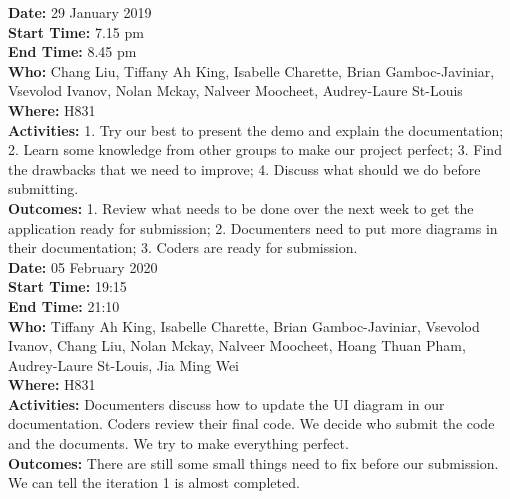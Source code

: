 \documentclass[12pt]{article}
\begin{document}
{\bf Date:} 29 January 2019\\
{\bf Start Time:} 7.15 pm\\
{\bf End Time:} 8.45 pm \\
{\bf Who:} Chang Liu, Tiffany Ah King, Isabelle Charette, Brian Gamboc-Javiniar, Vsevolod Ivanov, Nolan Mckay, Nalveer Moocheet, Audrey-Laure St-Louis\\
{\bf Where:} H831 \\
{\bf Activities:} 
1. Try our best to present the demo and explain the documentation;
2. Learn some knowledge from other groups to make our project perfect;
3. Find the drawbacks that we need to improve; 
4. Discuss what should we do before submitting. \\
{\bf Outcomes:} 
1. Review what needs to be done over the next week to get the application ready for submission; 
2. Documenters need to put more diagrams in their documentation;
3. Coders are ready for submission.\\

{\bf Date:} 05 February 2020\\
{\bf Start Time:} 19:15\\
{\bf End Time:}  21:10\\
{\bf Who:} Tiffany Ah King, Isabelle Charette, Brian Gamboc-Javiniar, Vsevolod Ivanov, Chang Liu, Nolan Mckay, Nalveer Moocheet, Hoang Thuan Pham, Audrey-Laure St-Louis, Jia Ming Wei\\
{\bf Where:} H831 \\
{\bf Activities:}  Documenters discuss how to update the UI diagram in our documentation. Coders review their final code. We decide who submit the code and the documents. We try to make everything perfect.\\
{\bf Outcomes:} There are still some small things need to fix before our submission. We can tell the iteration 1 is almost completed. \\
\end{document}

